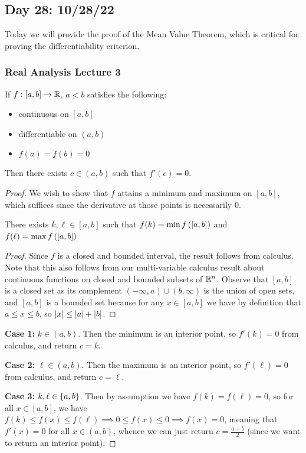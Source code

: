\documentclass[main.tex]{subfiles}
\begin{document}
\subsection{Day 28: 10/28/22}
Today we will provide the proof of the Mean Value Theorem, which is critical for proving the differentiability criterion.
\subsubsection{Real Analysis Lecture 3}
\begin{theorem}
    If $f : [a, b] \to \mathbb R$, $a < b$ satisfies the following:
    \begin{itemize}
        \item continuous on $[a, b]$
        \item differentiable on $(a, b)$
        \item $f(a) = f(b) = 0$
    \end{itemize}
    Then there exists $c\in (a, b)$ such that $f'(c) = 0$.
\end{theorem}

\begin{proof}
    We wish to show that $f$ attains a minimum and maximum on $[a, b]$, which suffices since the derivative at those points is necessarily $0$.

    \begin{claim}
        There exists $k, \ell \in [a, b]$ such that $f(k) = \min f\left( [a, b] \right)$ and $f(\ell) = \max f\left( [a, b] \right)$.
    \end{claim}

    \begin{proof}
        Since $f$ is a closed and bounded interval, the result follows from calculus. Note that this also follows from our multi-variable calculus result about continuous functions on closed and bounded subsets of $\mathbb R^n$. Observe that $[a, b]$ is a closed set as its complement $(-\infty, a) \cup (b, \infty)$ is the union of open sets, and $[a, b]$ is a bounded set because for any $x\in [a, b]$ we have by definition that $a \le x \le b$, so $\left\lvert x \right\rvert \le \left\lvert a \right\rvert + \left\lvert b \right\rvert$.
    \end{proof}
    \textbf{Case 1:} $k\in (a, b)$. Then the minimum is an interior point, so $f'(k) = 0$ from calculus, and return $c = k$.

    \textbf{Case 2:} $\ell\in (a, b)$. Then the maximum is an interior point, so $f'(\ell) = 0$ from calculus, and return $c = \ell$.

    \textbf{Case 3:} $k, \ell \in \left\{ a, b \right\}$. Then by assumption we have $f(k) = f(\ell) = 0$, so for all $x\in [a, b]$, we have $f(k) \le f(x) \le f(\ell) \implies 0 \le f(x) \le 0\implies f(x) = 0$, meaning that $f'(x) = 0$ for all $x\in (a, b)$, whence we can just return $c = \frac{a + b}{2}$ (since we want to return an interior point).
\end{proof}
\end{document}
